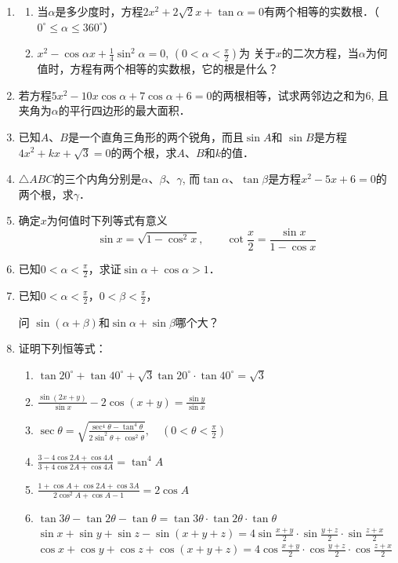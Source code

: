\begin{enumerate}
\item \begin{enumerate}
    \item 当$\alpha$是多少度时，方程$2x^2+2\sqrt{2}x+\tan \alpha=0$有两个相等的实数根．（$0^{\circ}\le \alpha\le 360^{\circ}$）
    \item $x^2-\cos\alpha x+\frac{1}{4}\sin^2\alpha=0$, $\left(0<\alpha<\frac{\pi}{2}\right)$为
关于$x$的二次方程，当$\alpha$为何值时，方程有两个相等的实数根，它的根是什么？
\end{enumerate}
\item 若方程$5x^2-10x\cos \alpha+7\cos\alpha+6=0$的两根相等，试求两邻边之和为6, 且夹角为$\alpha$的平行四边形的最大面积．
\item 已知$A$、$B$是一个直角三角形的两个锐角，而且$\sin A$和
$\sin B$是方程$4x^2+kx+\sqrt{3}=0$的两个根，求$A$、$B$和$k$的值．
\item $\triangle ABC$的三个内角分别是$\alpha$、$\beta$、$\gamma$, 而$\tan \alpha$、$\tan \beta$是方程$x^2-5x+6=0$的两个根，求$\gamma$．
\item 确定$x$为何值时下列等式有意义
\[\sin x=\sqrt{1-\cos^2x},\qquad \cot\frac{x}{2}=\frac{\sin x}{1-\cos x}\]
\item 已知$0<\alpha<\frac{\pi}{2}$，求证$\sin\alpha+\cos\alpha>1$．
\item 已知$0<\alpha<\frac{\pi}{2}$，$0<\beta<\frac{\pi}{2}$，

问 $\sin(\alpha+\beta)$和$\sin\alpha+\sin\beta$哪个大？
\item 证明下列恒等式：
\begin{enumerate}
    \item $\tan 20^{\circ}+\tan 40^{\circ}+\sqrt{3}\tan 20^{\circ}\cdot \tan 40^{\circ}=\sqrt{3}$
    \item $\frac{\sin (2 x+y)}{\sin x}-2 \cos (x+y)=\frac{\sin y}{\sin x}$
    \item $\sec \theta=\sqrt{\frac{\sec ^{4} \theta-\tan ^{4}\theta}{2 \sin ^{2} \theta+\cos ^{2} \theta}}, \quad\left(0<\theta<\frac{\pi}{2}\right)$
    \item $\frac{3-4 \cos 2 A+\cos 4 A}{3+4 \cos 2 A+\cos 4 A}=\tan ^{4} A$
    \item $\frac{1+\cos A+\cos 2 A+\cos 3 A}{2 \cos ^{2} A+\cos A-1}=2 \cos A$
    \item $\tan  3 \theta-\tan  2 \theta-\tan  \theta=\tan  3 \theta \cdot \tan  2 \theta \cdot \tan  \theta$
    \staritem $\sin x+\sin y+\sin z-\sin (x+y+z)=4 \sin \frac{x+y}{2} \cdot \sin \frac{y+z}{2} \cdot \sin \frac{z+x}{2}$
    \staritem $\cos x+\cos y+\cos z+\cos (x+y+z)=4 \cos \frac{x+y}{2} \cdot \cos \frac{y+z}{2} \cdot \cos \frac{z+x}{2}$
\end{enumerate}



\end{enumerate}
